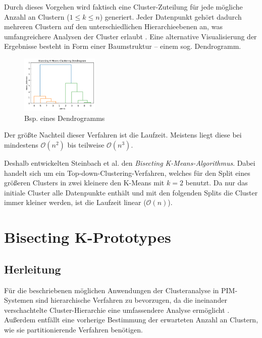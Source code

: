 Durch dieses Vorgehen wird faktisch eine Cluster-Zuteilung für jede
mögliche Anzahl an Clustern (\(1 \leq k \leq n\)) generiert. Jeder
Datenpunkt gehört dadurch mehreren Clustern auf den unterschiedlichen
Hierarchieebenen an, was umfangreichere Analysen der Cluster erlaubt
\autocite{dogan2022}. Eine alternative Visualisierung der Ergebnisse
besteht in Form einer Baumstruktur -- einem sog. Dendrogramm.
\autocite{steinbach2000}

\begin{figure}
\centering
\includegraphics[width=0.33\textwidth,height=\textheight]{img/dengrogram-example.png}
\caption{Bsp. eines Dendrogramms}
\end{figure}

Der größte Nachteil dieser Verfahren ist die Laufzeit. Meistens liegt
diese bei mindestens \(\mathcal{O}(n^2)\) bis teilweise
\(\mathcal{O}(n^3)\). \autocite{dogan2022}

Deshalb entwickelten Steinbach et al. \autocite{steinbach2000} den
\emph{Bisecting K-Means-Algorithmus}. Dabei handelt sich um ein
Top-down-Clustering-Verfahren, welches für den Split eines größeren
Clusters in zwei kleinere den K-Means mit \(k=2\) benutzt. Da nur das
initiale Cluster alle Datenpunkte enthält und mit den folgenden Splits
die Cluster immer kleiner werden, ist die Laufzeit linear
(\(\mathcal{O}(n)\)).

\hypertarget{bisecting-k-prototypes}{%
\section{Bisecting K-Prototypes}\label{bisecting-k-prototypes}}

\hypertarget{herleitung}{%
\subsection{Herleitung}\label{herleitung}}

Für die beschriebenen möglichen Anwendungen der Clusteranalyse in
PIM-Systemen sind hierarchische Verfahren zu bevorzugen, da die
ineinander verschachtelte Cluster-Hierarchie eine umfassendere Analyse
ermöglicht \autocite{dogan2022}. Außerdem entfällt eine vorherige
Bestimmung der erwarteten Anzahl an Clustern, wie sie partitionierende
Verfahren benötigen.

